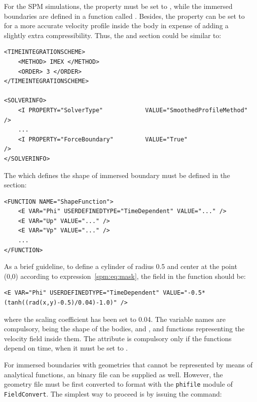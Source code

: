 For the SPM simulations, the property 
must be set to , while the immersed boundaries are
defined in a function called . Besides, the property
 can be set to  for a more accurate velocity 
profile inside the body in expense of adding a slightly extra compressibility.
Thus,
the 
and  section could be similar to:

\begin{lstlisting}[style=XMLStyle]
<TIMEINTEGRATIONSCHEME>
    <METHOD> IMEX </METHOD>
    <ORDER> 3 </ORDER>
</TIMEINTEGRATIONSCHEME>

<SOLVERINFO>
    <I PROPERTY="SolverType"            VALUE="SmoothedProfileMethod" />
    ...
    <I PROPERTY="ForceBoundary"         VALUE="True"                  />
</SOLVERINFO>
\end{lstlisting}

The  which defines the shape of immersed boundary must be
defined in the  section:

\begin{lstlisting}[style=XMLStyle]
<FUNCTION NAME="ShapeFunction">
    <E VAR="Phi" USERDEFINEDTYPE="TimeDependent" VALUE="..." />
    <E VAR="Up" VALUE="..." />
    <E VAR="Vp" VALUE="..." />
    ...
</FUNCTION>
\end{lstlisting}

As a brief guideline, to define a cylinder of radius 0.5 and center at the point
(0,0) according to expression~\eqref{spm:eq:mask}, the  field in
the  function should be:

\begin{lstlisting}[style=XMLStyle]
    <E VAR="Phi" USERDEFINEDTYPE="TimeDependent" VALUE="-0.5*(tanh((rad(x,y)-0.5)/0.04)-1.0)" />
\end{lstlisting}

where the scaling coefficient has been set to 0.04. The variable names are
compulsory, being  the shape of the bodies, and ,
 and  functions representing the velocity field inside
them. The attribute  is compulsory only if the functions
depend on time, when it must be set to .

For immersed boundaries with geometries that cannot be represented by means of
analytical functions, an  binary file can be supplied as well.
However, the geometry file must be first converted to  format with
the \texttt{phifile} module of \texttt{FieldConvert}. The simplest way to
proceed is by issuing the command:

